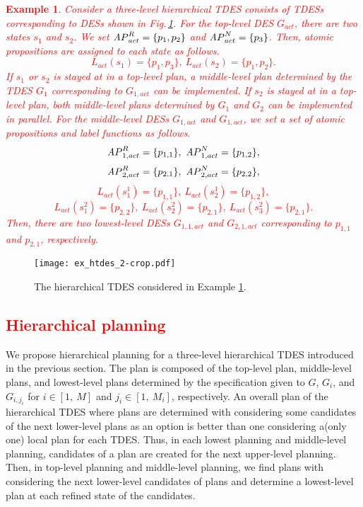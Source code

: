 \documentclass[journal,twoside,web]{IEEEtran}
\newtheorem{exa}{Example}
\newcommand{\rfig}[1]{Fig.\,\ref{#1}}
\newcommand{\AP}{{\textit AP}}
\newcommand{\red}[1]{\textcolor{red}{#1}}
\begin{document}
\red{
\begin{exa}\label{exa:hier}
Consider a three-level hierarchical TDES consists of TDESs corresponding to DESs shown in \rfig{ex:htdes}.
For the top-level DES $G_{act}$, there are two states $s_1$ and $s_2$.
We set $\AP^R_{act}=\{p_1,p_2\}$ and $\AP^N_{act}=\{p_3\}$. Then, atomic propositions are assigned to each state as follows.
\[
L_{act}(s_{1}) = \{p_1,p_3\},~
L_{act}(s_{2}) = \{p_1,p_2\}.
\]
If $s_1$ or $s_2$ is stayed at in a top-level plan, a middle-level plan determined by the TDES $G_1$ corresponding to $G_{1,act}$ can be implemented.
If $s_2$ is stayed at in a top-level plan, both middle-level plans determined by $G_1$ and $G_2$ can be implemented in parallel.
For the middle-level DESs $G_{1,act}$ and $G_{1,act}$, we set a set of atomic propositions and label functions as follows. 
\[
\AP^R_{1,act}=\{p_{1,1}\},~\AP^N_{1,act}=\{p_{1,2}\},
\]
\[
\AP^R_{2,act}=\{p_{2,1}\},~\AP^N_{2,act}=\{p_{2,2}\},
\]
\[
L_{act}(s_{1}^1) = \{p_{1,1}\},~
L_{act}(s_{2}^1) = \{p_{1,2}\},
\]
\[
L_{act}(s_{1}^2) = \{p_{2,2}\},~
L_{act}(s_{2}^2) = \{p_{2,1}\},~
L_{act}(s_{3}^2) = \{p_{2,1}\}.
\]
Then, there are two lowest-level DESs $G_{1,1,act}$ and $G_{2,1,act}$ corresponding to $p_{1,1}$ and $p_{2,1}$, respectively.
\end{exa}
}
%
\begin{figure}
\centering
\texttt{[image: ex\_htdes\_2-crop.pdf]}
\caption{The hierarchical TDES considered in Example \ref{exa:hier}.}
\label{ex:htdes}
\end{figure}
%
%
%
\red{\section{Hierarchical planning}}
%
We propose hierarchical planning for a three-level hierarchical TDES introduced in the previous section.
The plan is composed of the top-level plan, middle-level plans, and lowest-level plans determined by the specification given to $G$, $G_i$, and $G_{i,{j_i}}$ for $i\in [1,~M]$ and $j_i\in [1,~M_i]$, respectively.
An overall plan of the hierarchical TDES where plans are determined with considering some candidates of the next lower-level plans as an option is better than one considering a(only one)  local plan for each TDES.  
Thus, in each lowest planning and middle-level planning, candidates of a plan are created for the next upper-level planning.
Then, in top-level planning and middle-level planning, we find plans with considering the next lower-level candidates of plans and determine a lowest-level plan at each refined state of the candidates.
%
\end{document}
